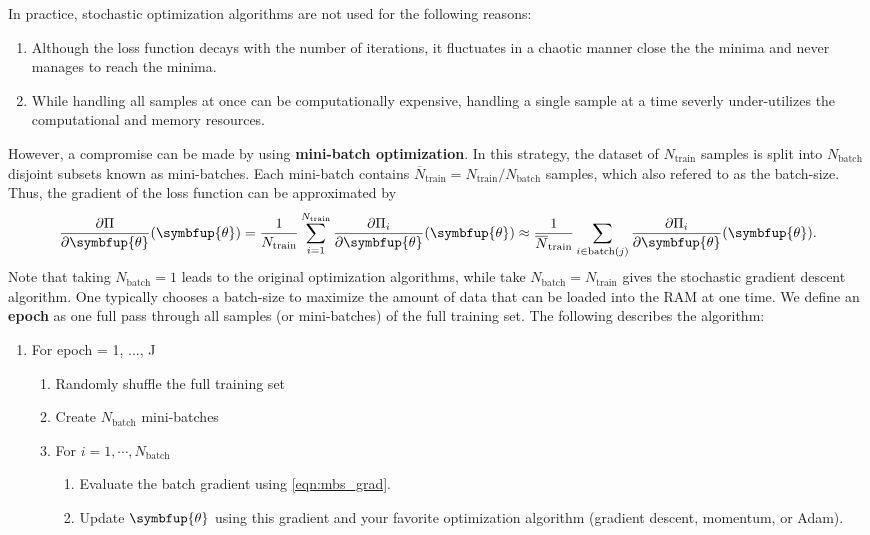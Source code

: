 \documentclass[11pt]{extarticle}
\theoremstyle{definition}
\newcommand{\btheta}{\symbfup{\theta}}
\newcommand{\df}[2]{\frac{\partial #1}{\partial #2}}
\begin{document}
In practice, stochastic optimization algorithms are not used for the following reasons:
\begin{enumerate}
  \item Although the loss function decays with the number of iterations, it fluctuates in a chaotic manner close the the minima and never manages to reach the minima.
  \item While handling all samples at once can be computationally expensive, handling a single sample at a time severly under-utilizes the computational and memory resources.
\end{enumerate}
However, a compromise can be made by using \textbf{mini-batch optimization}. In this strategy, the dataset of $N_\text{train}$ samples is split into $N_\text{batch}$ disjoint subsets known as mini-batches. Each mini-batch contains $\overline{N}_\text{train} = N_\text{train}/N_\text{batch}$ samples, which also refered to as the batch-size. Thus, the gradient of the loss function can be approximated by 
\begin{equation}\label{eqn:mbs_grad}
  \df{\Pi}{\btheta}(\btheta) = \frac{1}{N_\text{train}} \sum_{i=1}^{N_\text{train}} \df{\Pi_i}{\btheta}(\btheta) \approx \frac{1}{\overline{N}_\text{train}} \sum_{i \in \text{batch}(j)} \df{\Pi_i}{\btheta}(\btheta).
\end{equation}
Note that taking $N_\text{batch} = 1$ leads to the original optimization algorithms, while take $N_\text{batch} = N_\text{train}$ gives the stochastic gradient descent algorithm. One typically chooses a batch-size to maximize the amount of data that can be loaded into the RAM at one time. We define an \textbf{epoch} as one full pass through all samples (or mini-batches) of the full training set. The following describes the  algorithm:
\begin{enumerate}
\item For epoch = 1, ..., J
  \begin{enumerate}
     \item Randomly shuffle the full training set
     \item Create $N_\text{batch}$ mini-batches
     \item For $ i = 1, \cdots, N_\text{batch}$
     \begin{enumerate}
        \item Evaluate the batch gradient using \eqref{eqn:mbs_grad}.
        \item Update $\btheta$ using this gradient and your favorite optimization algorithm (gradient descent, momentum, or Adam).
      \end{enumerate}   
   \end{enumerate}
\end{enumerate}
\end{document}
